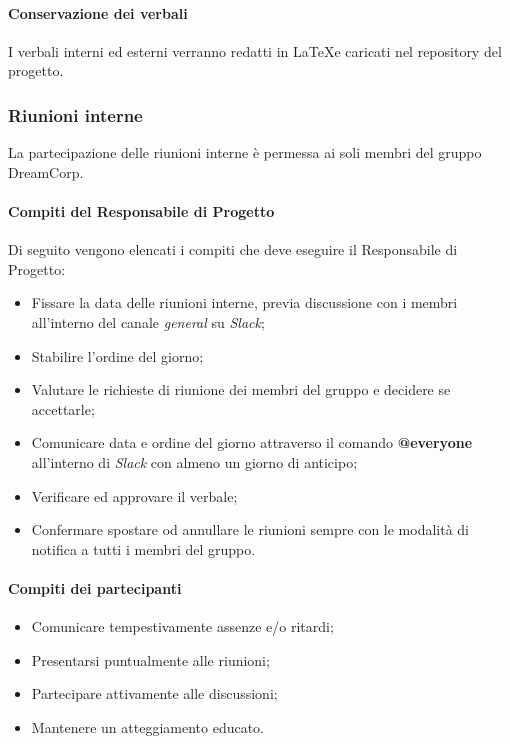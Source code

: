                     \paragraph{Conservazione dei verbali}
                        I verbali interni ed esterni verranno redatti in \LaTeX e caricati nel repository del progetto.
                \subsubsection{Riunioni interne}
                    La partecipazione delle riunioni interne è permessa ai soli membri del gruppo DreamCorp.
                    \newline
                    \paragraph{Compiti del Responsabile di Progetto}
                        Di seguito vengono elencati i compiti che deve eseguire il Responsabile di Progetto:
                        \begin{itemize}
                            \item Fissare la data delle riunioni interne, previa discussione con i membri all'interno del canale \textit{general} su \textit{Slack};
                            \item Stabilire l'ordine del giorno;
                            \item Valutare le richieste di riunione dei membri del gruppo e decidere se accettarle;
                            \item Comunicare data e ordine del giorno attraverso il comando \textbf{@everyone} all'interno di \textit{Slack} con almeno un giorno di anticipo;
                            \item Verificare ed approvare il verbale;
                            \item Confermare spostare od annullare le riunioni sempre con le modalità di notifica a tutti i membri del gruppo.
                         \end{itemize}
                     \paragraph{Compiti dei partecipanti}
                        \begin{itemize}
                            \item Comunicare tempestivamente assenze e/o ritardi; 
                            \item Presentarsi puntualmente alle riunioni;
                            \item Partecipare attivamente alle discussioni;
                            \item Mantenere un atteggiamento educato.
                        \end{itemize}
